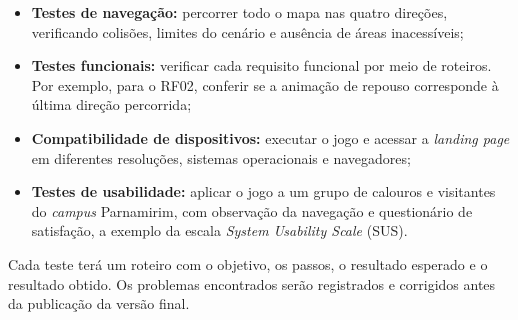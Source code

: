 \documentclass[12pt, a4paper]{article}
\begin{document}
\begin{itemize}
    \item \textbf{Testes de navegação:} percorrer todo o mapa nas quatro direções,
    verificando colisões, limites do cenário e ausência de áreas inacessíveis;

    \item \textbf{Testes funcionais:} verificar cada requisito funcional por meio
    de roteiros. Por exemplo, para o RF02, conferir se a animação de repouso
    corresponde à última direção percorrida;

    \item \textbf{Compatibilidade de dispositivos:} executar o jogo e acessar a
    \textit{landing page} em diferentes resoluções, sistemas operacionais e
    navegadores;

    \item \textbf{Testes de usabilidade:} aplicar o jogo a um grupo de calouros e
    visitantes do \textit{campus} Parnamirim, com observação da navegação e
    questionário de satisfação, a exemplo da escala \textit{System Usability Scale}
    (SUS).
\end{itemize}

Cada teste terá um roteiro com o objetivo, os passos, o resultado esperado e o
resultado obtido. Os problemas encontrados serão registrados e corrigidos antes
da publicação da versão final.
\end{document}
